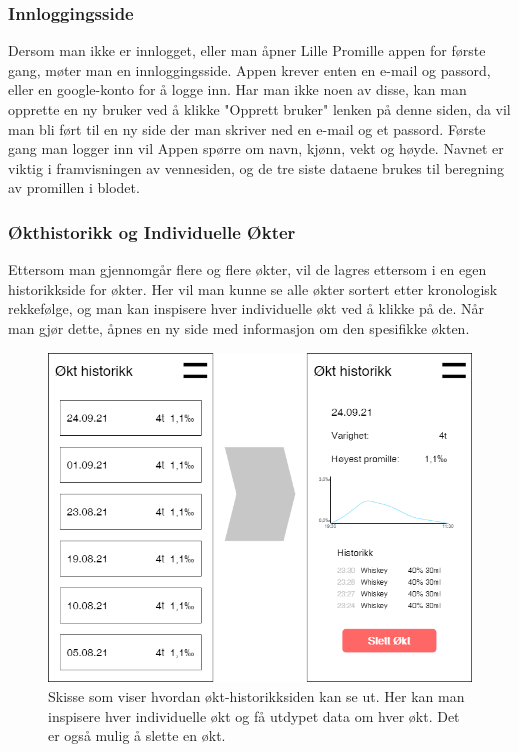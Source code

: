 \documentclass[12pt]{article}
\begin{document}
\subsubsection{Innloggingsside}
Dersom man ikke er innlogget, eller man åpner Lille Promille appen for første gang, møter man en innloggingsside. Appen krever enten en e-mail og passord, eller en google-konto for å logge inn. Har man ikke noen av disse, kan man opprette en ny bruker ved å klikke "Opprett bruker" lenken på denne siden, da vil man bli ført til en ny side der man skriver ned en e-mail og et passord. Første gang man logger inn vil Appen spørre om navn, kjønn, vekt og høyde. Navnet er viktig i framvisningen av vennesiden, og de tre siste dataene brukes til beregning av promillen i blodet.

\subsubsection{Økthistorikk og Individuelle Økter}
Ettersom man gjennomgår flere og flere økter, vil de lagres ettersom i en egen historikkside for økter. Her vil man kunne se alle økter sortert etter kronologisk rekkefølge, og man kan inspisere hver individuelle økt ved å klikke på de. Når man gjør dette, åpnes en ny side med informasjon om den spesifikke økten.

\begin{figure}[H]
    \centering
    \includegraphics[scale=0.4]{images/lille_promille_sessions.drawio.png}
    \caption{Skisse som viser hvordan økt-historikksiden kan se ut. Her kan man inspisere hver individuelle økt og få utdypet data om hver økt. Det er også mulig å slette en økt.}
\end{figure}
\end{document}
